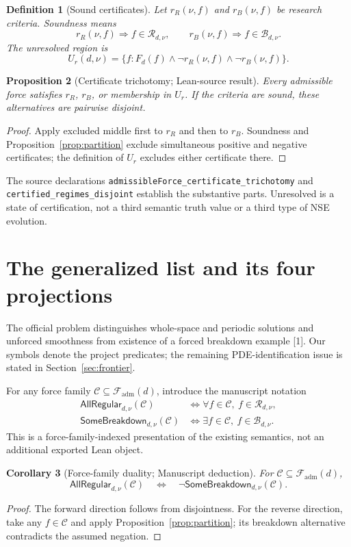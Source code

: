 \documentclass[11pt,a4paper]{article}
\newtheorem{proposition}{Proposition}[section]
\newtheorem{definition}[proposition]{Definition}
\newtheorem{corollary}[proposition]{Corollary}
\theoremstyle{remark}\newtheorem{remark}[proposition]{Remark}
\newcommand{\Reg}{\mathcal R}
\newcommand{\Bad}{\mathcal B}
\newcommand{\Adm}{\mathcal F_{\mathrm{adm}}}
\newcommand{\code}[1]{\nolinkurl{#1}}
\newcommand{\verified}{\textsf{Lean-source result}}
\newcommand{\editorial}{\textsf{Manuscript deduction}}
\begin{document}
\begin{definition}[Sound certificates]
Let $r_R(\nu,f)$ and $r_B(\nu,f)$ be research criteria. Soundness means
\[
 r_R(\nu,f)\Rightarrow f\in\Reg_{d,\nu},
 \qquad r_B(\nu,f)\Rightarrow f\in\Bad_{d,\nu}.
\]
The unresolved region is
\[
 U_r(d,\nu)=\{f:F_d(f)\land\neg r_R(\nu,f)\land\neg r_B(\nu,f)\}.
\]
\end{definition}

\begin{proposition}[Certificate trichotomy; \verified]
Every admissible force satisfies $r_R$, $r_B$, or membership in $U_r$. If the criteria are sound, these alternatives are pairwise disjoint.
\end{proposition}
\begin{proof}
Apply excluded middle first to $r_R$ and then to $r_B$. Soundness and Proposition~\ref{prop:partition} exclude simultaneous positive and negative certificates; the definition of $U_r$ excludes either certificate there.
\end{proof}
The source declarations \code{admissibleForce_certificate_trichotomy} and \code{certified_regimes_disjoint} establish the substantive parts. Unresolved is a state of certification, not a third semantic truth value or a third type of NSE evolution.

\section{The generalized list and its four projections}
The official problem distinguishes whole-space and periodic solutions and unforced smoothness from existence of a forced breakdown example [1]. Our symbols denote the project predicates; the remaining PDE-identification issue is stated in Section~\ref{sec:frontier}.

For any force family $\mathcal C\subseteq\Adm(d)$, introduce the manuscript notation
\begin{align}
 \mathsf{AllRegular}_{d,\nu}(\mathcal C)
 &\Longleftrightarrow \forall f\in\mathcal C,\ f\in\Reg_{d,\nu},\\
 \mathsf{SomeBreakdown}_{d,\nu}(\mathcal C)
 &\Longleftrightarrow \exists f\in\mathcal C,\ f\in\Bad_{d,\nu}.
\end{align}
This is a force-family-indexed presentation of the existing semantics, not an additional exported Lean object.

\begin{corollary}[Force-family duality; \editorial]
For $\mathcal C\subseteq\Adm(d)$,
\[
 \mathsf{AllRegular}_{d,\nu}(\mathcal C)
 \quad\Longleftrightarrow\quad
 \neg\mathsf{SomeBreakdown}_{d,\nu}(\mathcal C).
\]
\end{corollary}
\begin{proof}
The forward direction follows from disjointness. For the reverse direction, take any $f\in\mathcal C$ and apply Proposition~\ref{prop:partition}; its breakdown alternative contradicts the assumed negation.
\end{proof}
\end{document}
